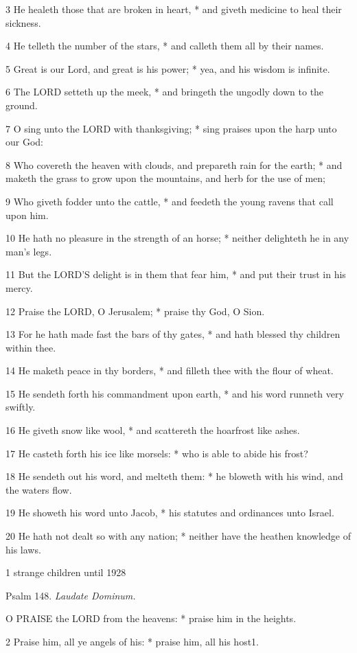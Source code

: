 3 He healeth those that are broken in heart, * and
giveth medicine to heal their sickness.

4 He telleth the number of the stars, * and calleth
them all by their names.

5 Great is our Lord, and great is his power; * yea,
and his wisdom is infinite.

6 The LORD setteth up the meek, * and bringeth the
ungodly down to the ground.

7 O sing unto the LORD with thanksgiving; * sing praises
upon the harp unto our God:

8 Who covereth the heaven with clouds, and prepareth
rain for the earth; * and maketh the grass to grow upon the mountains,
and herb for the use of men;

9 Who giveth fodder unto the cattle, * and feedeth
the young ravens that call upon him.

10 He hath no pleasure in the strength of an horse;
* neither delighteth he in any man's legs.

11 But the LORD’S delight is in them that fear
him, * and put their trust in his mercy.

12 Praise the LORD, O Jerusalem; * praise thy God,
O Sion.

13 For he hath made fast the bars of thy gates, * and
hath blessed thy children within thee.

14 He maketh peace in thy borders, * and filleth thee
with the flour of wheat.

15 He sendeth forth his commandment upon earth, * and
his word runneth very swiftly.

16 He giveth snow like wool, * and scattereth the hoarfrost
like ashes.

17 He casteth forth his ice like morsels: * who is
able to abide his frost?

18 He sendeth out his word, and melteth them: * he
bloweth with his wind, and the waters flow.

19 He showeth his word unto Jacob, * his statutes and
ordinances unto Israel.

20 He hath not dealt so with any nation; * neither
have the heathen knowledge of his laws.

1 strange children until
1928

Psalm
148. \emph{Laudate Dominum.}

O
PRAISE the LORD from the heavens: * praise him in the heights.

2 Praise him, all ye angels of his: * praise him, all
his host1.

